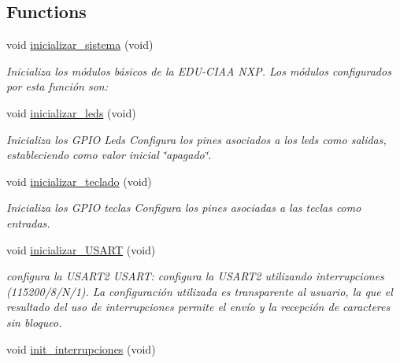 \subsection*{Functions}
\begin{DoxyCompactItemize}
\item 
void \hyperlink{group__operaciones_ga60b214b62e3bc463170aa71986a26a52}{inicializar\+\_\+sistema} (void)
\begin{DoxyCompactList}\small\item\em Inicializa los módulos básicos de la E\+D\+U-\/\+C\+I\+AA N\+XP. Los módulos configurados por esta función son\+: \end{DoxyCompactList}\item 
void \hyperlink{group__operaciones_gac2a7df7aa80e74c31cb5e7159ea3af26}{inicializar\+\_\+leds} (void)\hypertarget{group__operaciones_gac2a7df7aa80e74c31cb5e7159ea3af26}{}\label{group__operaciones_gac2a7df7aa80e74c31cb5e7159ea3af26}

\begin{DoxyCompactList}\small\item\em Inicializa los G\+P\+IO Leds Configura los pines asociados a los leds como salidas, estableciendo como valor inicial \char`\"{}apagado\char`\"{}. \end{DoxyCompactList}\item 
void \hyperlink{group__operaciones_ga03453754020d455c557635e866da3d4d}{inicializar\+\_\+teclado} (void)\hypertarget{group__operaciones_ga03453754020d455c557635e866da3d4d}{}\label{group__operaciones_ga03453754020d455c557635e866da3d4d}

\begin{DoxyCompactList}\small\item\em Inicializa los G\+P\+IO teclas Configura los pines asociadas a las teclas como entradas. \end{DoxyCompactList}\item 
void \hyperlink{group__operaciones_gaed73c66c75c4cfa90cb51636d371f6c1}{inicializar\+\_\+\+U\+S\+A\+RT} (void)\hypertarget{group__operaciones_gaed73c66c75c4cfa90cb51636d371f6c1}{}\label{group__operaciones_gaed73c66c75c4cfa90cb51636d371f6c1}

\begin{DoxyCompactList}\small\item\em configura la U\+S\+A\+R\+T2 U\+S\+A\+RT\+: configura la U\+S\+A\+R\+T2 utilizando interrupciones (115200/8/\+N/1). La configuración utilizada es transparente al usuario, la que el resultado del uso de interrupciones permite el envío y la recepción de caracteres sin bloqueo. \end{DoxyCompactList}\item 
void \hyperlink{group__operaciones_ga140cd744a440c2dc293252afbac6c2fc}{init\+\_\+interrupciones} (void)\hypertarget{group__operaciones_ga140cd744a440c2dc293252afbac6c2fc}{}\label{group__operaciones_ga140cd744a440c2dc293252afbac6c2fc}


\end{DoxyCompactItemize}
